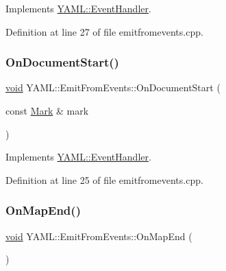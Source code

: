 Implements \mbox{\hyperlink{class_y_a_m_l_1_1_event_handler_afc0d547e87f9c1f63ba8087aabd7e34a}{Y\+A\+M\+L\+::\+Event\+Handler}}.



Definition at line 27 of file emitfromevents.\+cpp.

\mbox{\label{class_y_a_m_l_1_1_emit_from_events_a1099ab75b0df15b3d5b42d07a935a6c6}} 
\subsubsection{\texorpdfstring{OnDocumentStart()}{OnDocumentStart()}}
{\footnotesize\ttfamily \mbox{\hyperlink{glad_8h_a950fc91edb4504f62f1c577bf4727c29}{void}} Y\+A\+M\+L\+::\+Emit\+From\+Events\+::\+On\+Document\+Start (\begin{DoxyParamCaption}\item[{const \mbox{\hyperlink{struct_y_a_m_l_1_1_mark}{Mark}} \&}]{mark }\end{DoxyParamCaption})\hspace{0.3cm}{\ttfamily [virtual]}}



Implements \mbox{\hyperlink{class_y_a_m_l_1_1_event_handler_adb739beb59e227bd320aab1e61bf42e4}{Y\+A\+M\+L\+::\+Event\+Handler}}.



Definition at line 25 of file emitfromevents.\+cpp.

\mbox{\label{class_y_a_m_l_1_1_emit_from_events_ae2691daa2ec354c998d1ed25c648fd06}} 
\subsubsection{\texorpdfstring{OnMapEnd()}{OnMapEnd()}}
{\footnotesize\ttfamily \mbox{\hyperlink{glad_8h_a950fc91edb4504f62f1c577bf4727c29}{void}} Y\+A\+M\+L\+::\+Emit\+From\+Events\+::\+On\+Map\+End (\begin{DoxyParamCaption}{ }\end{DoxyParamCaption})\hspace{0.3cm}{\ttfamily [virtual]}}



